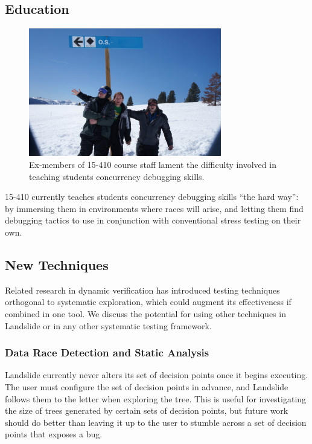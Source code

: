 \subsection{Education}
\label{sec:future-education}

\begin{figure}[h]
	\begin{center}
	\includegraphics[width=0.75\textwidth]{wont-modify-vail.jpg}
	\end{center}
	\caption{Ex-members of 15-410 course staff lament the difficulty involved in teaching students concurrency debugging skills.}
\end{figure}

15-410 currently teaches students concurrency debugging skills ``the hard way'': by immersing them in environments where races will arise, and letting them find debugging tactics to use in conjunction with conventional stress testing on their own.

\subsection{New Techniques}
\label{sec:future-new}

Related research in dynamic verification has introduced testing techniques orthogonal to systematic exploration, which could augment its effectiveness if combined in one tool. We discuss the potential for using other techniques in Landslide or in any other systematic testing framework.

\subsubsection{Data Race Detection and Static Analysis}

Landslide currently never alters its set of decision points once it begins executing. The user must configure the set of decision points in advance, and Landslide follows them to the letter when exploring the tree. This is useful for investigating the size of trees generated by certain sets of decision points, but future work should do better than leaving it up to the user to stumble across a set of decision points that exposes a bug.

